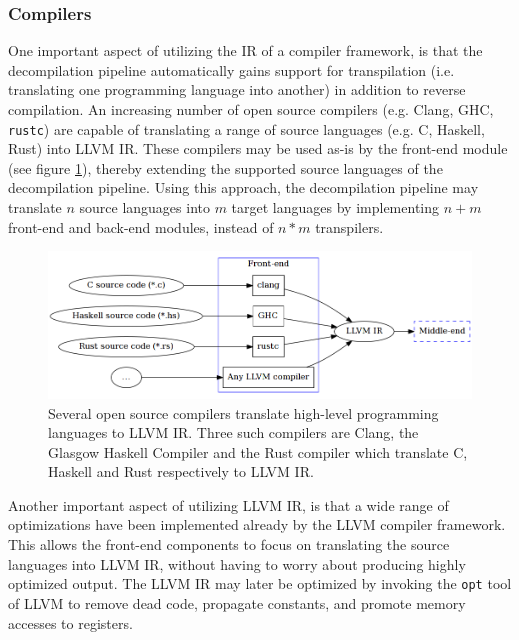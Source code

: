 
\subsubsection{Compilers}
\label{sec:compilers}

One important aspect of utilizing the IR of a compiler framework, is that the decompilation pipeline automatically gains support for transpilation (i.e. translating one programming language into another) in addition to reverse compilation. An increasing number of open source compilers (e.g. Clang, GHC, \texttt{rustc}) are capable of translating a range of source languages (e.g. C, Haskell, Rust) into LLVM IR. These compilers may be used as-is by the front-end module (see figure \ref{fig:front-end_source}), thereby extending the supported source languages of the decompilation pipeline. Using this approach, the decompilation pipeline may translate $ n $ source languages into $ m $ target languages by implementing $ n + m $ front-end and back-end modules, instead of $ n * m $ transpilers.

\begin{figure}[htbp]
	\begin{center}
		\includegraphics[width=\textwidth]{inc/front-end_source.png}
		\caption{Several open source compilers translate high-level programming languages to LLVM IR. Three such compilers are Clang, the Glasgow Haskell Compiler and the Rust compiler which translate C, Haskell and Rust respectively to LLVM IR.}
		\label{fig:front-end_source}
	\end{center}
\end{figure}

Another important aspect of utilizing LLVM IR, is that a wide range of optimizations have been implemented already by the LLVM compiler framework. This allows the front-end components to focus on translating the source languages into LLVM IR, without having to worry about producing highly optimized output. The LLVM IR may later be optimized by invoking the \texttt{opt} tool of LLVM to remove dead code, propagate constants, and promote memory accesses to registers.
